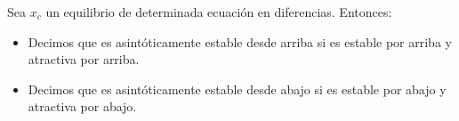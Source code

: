 \begin{definicion}
    Sea $x_c$ un equilibrio de determinada ecuación en diferencias. Entonces:
    \begin{itemize}
        \item Decimos que es asintóticamente estable desde arriba si es estable por arriba y atractiva por arriba.
        \item Decimos que es asintóticamente estable desde abajo si es estable por abajo y atractiva por abajo.
    \end{itemize}
\end{definicion}

\begin{comment}
\begin{notacion}[Semiestable]
    Sea $x_c$ un equilibrio, algunas veces diremos que esta es semiestable si es ¿in?estable por arriba o por abajo.
\end{notacion}
\end{comment}

